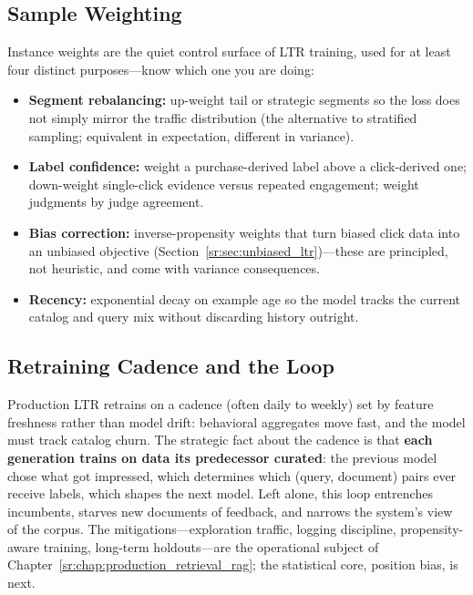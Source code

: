 \subsection{Sample Weighting}

Instance weights are the quiet control surface of LTR training, used for at least four distinct purposes---know which one you are doing:

\begin{itemize}
    \item \textbf{Segment rebalancing:} up-weight tail or strategic segments so the loss does not simply mirror the traffic distribution (the alternative to stratified sampling; equivalent in expectation, different in variance).
    \item \textbf{Label confidence:} weight a purchase-derived label above a click-derived one; down-weight single-click evidence versus repeated engagement; weight judgments by judge agreement.
    \item \textbf{Bias correction:} inverse-propensity weights that turn biased click data into an unbiased objective (Section~\ref{sr:sec:unbiased_ltr})---these are principled, not heuristic, and come with variance consequences.
    \item \textbf{Recency:} exponential decay on example age so the model tracks the current catalog and query mix without discarding history outright.
\end{itemize}

\subsection{Retraining Cadence and the Loop}

Production LTR retrains on a cadence (often daily to weekly) set by feature freshness rather than model drift: behavioral aggregates move fast, and the model must track catalog churn. The strategic fact about the cadence is that \textbf{each generation trains on data its predecessor curated}: the previous model chose what got impressed, which determines which (query, document) pairs ever receive labels, which shapes the next model. Left alone, this loop entrenches incumbents, starves new documents of feedback, and narrows the system's view of the corpus. The mitigations---exploration traffic, logging discipline, propensity-aware training, long-term holdouts---are the operational subject of Chapter~\ref{sr:chap:production_retrieval_rag}; the statistical core, position bias, is next.

